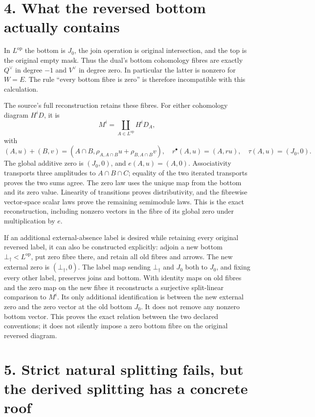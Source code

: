 \documentclass[
  11pt,
]{article}
\begin{document}
\section{4. What the reversed bottom actually
contains}\label{what-the-reversed-bottom-actually-contains}

In \(L^{\mathrm{op}}\) the bottom is \(J_0\), the join operation is
original intersection, and the top is the original empty mask. Thus the
dual's bottom cohomology fibres are exactly \(Q^\vee\) in degree \(-1\)
and \(V^\vee\) in degree zero. In particular the latter is nonzero for
\(W=E\). The rule ``every bottom fibre is zero'' is therefore
incompatible with this calculation.

The source's full reconstruction retains these fibres. For either
cohomology diagram \(H^iD\), it is \[
M^i=\coprod_{A\in L^{\mathrm{op}}}H^iD_A,
\] with \[
(A,u)+(B,v)=
(A\cap B,\rho_{A,A\cap B}u+\rho_{B,A\cap B}v),
\quad
r^\bullet(A,u)=(A,ru),
\quad
\tau(A,u)=(J_0,0).
\] The global additive zero is \((J_0,0)\), and \(e(A,u)=(A,0)\).
Associativity transports three amplitudes to \(A\cap B\cap C\); equality
of the two iterated transports proves the two sums agree. The zero law
uses the unique map from the bottom and its zero value. Linearity of
transitions proves distributivity, and the fibrewise vector-space scalar
laws prove the remaining semimodule laws. This is the exact
reconstruction, including nonzero vectors in the fibre of its global
zero under multiplication by \(e\).

If an additional external-absence label is desired while retaining every
original reversed label, it can also be constructed explicitly: adjoin a
new bottom \(\bot_\dagger<L^{\mathrm{op}}\), put zero fibre there, and
retain all old fibres and arrows. The new external zero is
\((\bot_\dagger,0)\). The label map sending \(\bot_\dagger\) and \(J_0\)
both to \(J_0\), and fixing every other label, preserves joins and
bottom. With identity maps on old fibres and the zero map on the new
fibre it reconstructs a surjective split-linear comparison to \(M^i\).
Its only additional identification is between the new external zero and
the zero vector at the old bottom \(J_0\). It does not remove any
nonzero bottom vector. This proves the exact relation between the two
declared conventions; it does not silently impose a zero bottom fibre on
the original reversed diagram.

\section{5. Strict natural splitting fails, but the derived splitting
has a concrete
roof}\label{strict-natural-splitting-fails-but-the-derived-splitting-has-a-concrete-roof}
\end{document}
